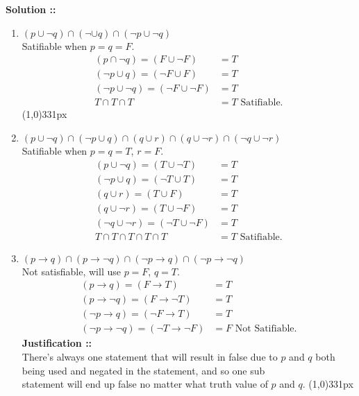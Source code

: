 \documentclass[11pt]{article}
\begin{document}
\vspace{5px}\textbf{Solution ::}
\begin{enumerate}[label=6.\arabic* ::]
\item 
$(p\cup\neg q)\cap(\neg\cup q)\cap(\neg p\cup\neg q)$ \\
Satifiable when $p = q = F$.
\begin{align}
    (p\cap\neg q) = (F\cup\neg F) &= T \\
    (\neg p\cup q)=(\neg F\cup F) &= T \\
    (\neg p\cup\neg q)=(\neg F\cup\neg F) &= T\\
    T\cap T\cap T &= T \text{ Satifiable.}
\end{align}\line(1,0){331px}

\item
$(p\cup\neg q)\cap(\neg p\cup q)\cap(q\cup r)\cap(q\cup\neg r)\cap(\neg q\cup\neg r)$ \\
Satifiable when $p = q = T$, $r=F$.
\begin{align}
    (p\cup\neg q) = (T\cup\neg T) &= T \\
    (\neg p\cup q) = (\neg T\cup T) &= T \\
    (q\cup r) = (T\cup F) &= T \\
    (q\cup\neg r) = (T\cup\neg F) &= T \\
    (\neg q\cup\neg r) = (\neg T\cup\neg F) &= T \\
    T\cap T\cap T\cap T\cap T &= T \text{ Satifiable.}
\end{align}

\pagebreak
\item
$(p\rightarrow q)\cap(p\rightarrow\neg q)\cap(\neg p\rightarrow q)\cap
(\neg p\rightarrow\neg q)$ \\
Not satisfiable, will use $p = F$, $q = T$.
\begin{align}
    (p\rightarrow q) = (F\rightarrow T) &= T \\
    (p\rightarrow\neg q) = (F\rightarrow\neg T) &= T \\
    (\neg p\rightarrow q) = (\neg F\rightarrow T) &= T \\
    (\neg p\rightarrow\neg q) = (\neg T\rightarrow\neg F) &= F \text{ Not Satifiable.}
\end{align}
\textbf{Justification ::} \\
There's always one statement that will result in false due to $p$ and $q$ both being used
and negated in the statement, and so one sub \\statement will end up false no matter what
truth value of $p$ and $q$.
\line(1,0){331px}


\end{enumerate}
\end{document}
